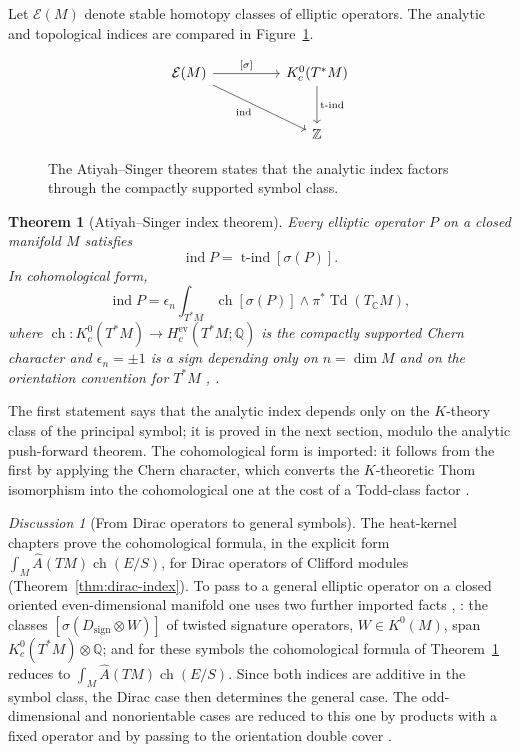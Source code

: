 \documentclass[11pt,oneside,reqno]{book}
\DeclareMathOperator{\ind}{ind}
\newcommand{\C}{\mathbb C}
\newcommand{\Ahat}{\widehat A}
\theoremstyle{plain}
\newtheorem{theorem}{Theorem}[chapter]
\theoremstyle{definition}
\theoremstyle{remark}
\newtheorem*{discussion}{Discussion}
\begin{document}
Let \(\mathcal E(M)\) denote stable homotopy classes of elliptic operators.
The analytic and topological indices are compared in
Figure~\ref{fig:index-diagram}.

\begin{figure}[htbp]
\centering
\[
\begin{tikzcd}[column sep=huge,row sep=large]
 \mathcal E(M)
   \arrow[r,"{[\sigma]}"]
   \arrow[dr,"{\operatorname{ind}}"',pos=.45]
 & K_c^0(T^*M) \arrow[d,"{\operatorname{t\text{-}ind}}"]\\
 & \mathbb Z
\end{tikzcd}
\]
\caption[Analytic and topological index]{The Atiyah--Singer theorem states that the analytic index factors
through the compactly supported symbol class.}
\label{fig:index-diagram}
\end{figure}

\begin{theorem}[Atiyah--Singer index theorem]\label{thm:AS}
Every elliptic operator \(P\) on a closed manifold \(M\) satisfies
\[
 \ind P=\operatorname{t\text{-}ind}[\sigma(P)].
\]
In cohomological form,
\[
 \ind P
 =\epsilon_n\int_{T^*M}
 \operatorname{ch}[\sigma(P)]\wedge\pi^*\operatorname{Td}(T_\C M),
\]
where \(\operatorname{ch}:K_c^0(T^*M)\to H_c^{\mathrm{ev}}(T^*M;\mathbb Q)\)
is the compactly supported Chern character and \(\epsilon_n=\pm1\) is a
sign depending only on \(n=\dim M\) and on the orientation convention for
\(T^*M\) \cite{ASIII}, \cite[Chapter~III]{LM}.
\end{theorem}

The first statement says that the analytic index depends only on the
\(K\)-theory class of the principal symbol; it is proved in the next
section, modulo the analytic push-forward theorem.  The cohomological form
is imported: it follows from the first by applying the Chern character,
which converts the \(K\)-theoretic Thom isomorphism into the cohomological
one at the cost of a Todd-class factor \cite{ASIII}.

\begin{discussion}[From Dirac operators to general symbols]
The heat-kernel chapters prove the cohomological formula, in the explicit
form \(\int_M\Ahat(TM)\operatorname{ch}(E/S)\), for Dirac operators of
Clifford modules (Theorem~\ref{thm:dirac-index}).  To pass to a general
elliptic operator on a closed oriented even-dimensional manifold one uses
two further imported facts \cite{ASIII}, \cite[Chapter~III]{LM}: the
classes \([\sigma(D_{\mathrm{sign}}\otimes W)]\) of twisted signature
operators, \(W\in K^0(M)\), span \(K_c^0(T^*M)\otimes\mathbb Q\); and for
these symbols the cohomological formula of Theorem~\ref{thm:AS} reduces to
\(\int_M\Ahat(TM)\operatorname{ch}(E/S)\).  Since both indices are additive
in the symbol class, the Dirac case then determines the general case.  The
odd-dimensional and nonorientable cases are reduced to this one by
products with a fixed operator and by passing to the orientation double
cover \cite{ASIII}.
\end{discussion}
\end{document}
